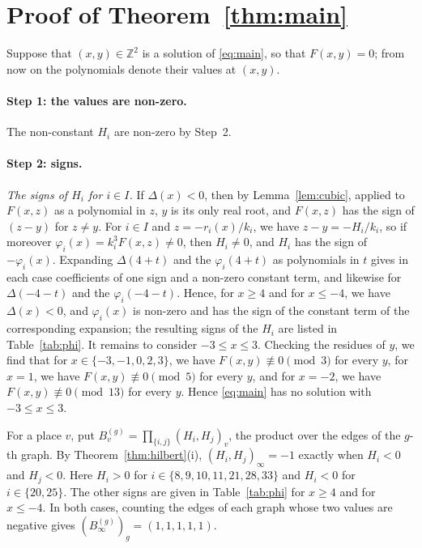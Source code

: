 \documentclass[11pt]{article}
\newcommand{\Z}{\mathbb{Z}}
\begin{document}
\section{Proof of Theorem~\ref{thm:main}}

Suppose that $(x,y)\in\Z^2$ is a solution of \eqref{eq:main}, so that $F(x,y)=0$; from now on the polynomials denote their values at $(x,y)$.
\paragraph{Step 1: the values are non-zero.} The non-constant $H_i$ are non-zero by Step~2.

\paragraph{Step 2: signs.} \emph{The signs of $H_i$ for $i\in I$.} If $\Delta(x)<0$, then by Lemma~\ref{lem:cubic}, applied to $F(x,z)$ as a polynomial in $z$, $y$ is its only real root, and $F(x,z)$ has the sign of $(z-y)$ for $z\neq y$. For $i\in I$ and $z=-r_i(x)/k_i$, we have $z-y=-H_i/k_i$, so if moreover $\varphi_i(x)=k_i^3F(x,z)\neq0$, then $H_i\neq0$, and $H_i$ has the sign of $-\varphi_i(x)$. Expanding $\Delta(4+t)$ and the $\varphi_i(4+t)$ as polynomials in $t$ gives in each case coefficients of one sign and a non-zero constant term, and likewise for $\Delta(-4-t)$ and the $\varphi_i(-4-t)$. Hence, for $x\geq4$ and for $x\leq-4$, we have $\Delta(x)<0$, and $\varphi_i(x)$ is non-zero and has the sign of the constant term of the corresponding expansion; the resulting signs of the $H_i$ are listed in Table~\ref{tab:phi}. It remains to consider $-3\leq x\leq3$. Checking the residues of $y$, we find that for $x\in\{-3,\allowbreak -1,\allowbreak 0,\allowbreak 2,\allowbreak 3\}$, we have $F(x,y)\not\equiv0\pmod{3}$ for every $y$, for $x=1$, we have $F(x,y)\not\equiv0\pmod{5}$ for every $y$, and for $x=-2$, we have $F(x,y)\not\equiv0\pmod{13}$ for every $y$. Hence \eqref{eq:main} has no solution with $-3\leq x\leq3$.

For a place $v$, put $B^{(g)}_v=\prod_{\{i,j\}}(H_i,H_j)_v$, the product over the edges of the $g$-th graph. By Theorem~\ref{thm:hilbert}(i), $(H_i,H_j)_\infty=-1$ exactly when $H_i<0$ and $H_j<0$. Here $H_i>0$ for $i\in\{8,\allowbreak 9,\allowbreak 10,\allowbreak 11,\allowbreak 21,\allowbreak 28,\allowbreak 33\}$ and $H_i<0$ for $i\in\{20,\allowbreak 25\}$. The other signs are given in Table~\ref{tab:phi} for $x\geq4$ and for $x\leq-4$. In both cases, counting the edges of each graph whose two values are negative gives $(B^{(g)}_\infty)_g=(1,1,1,1,1)$.
\end{document}
